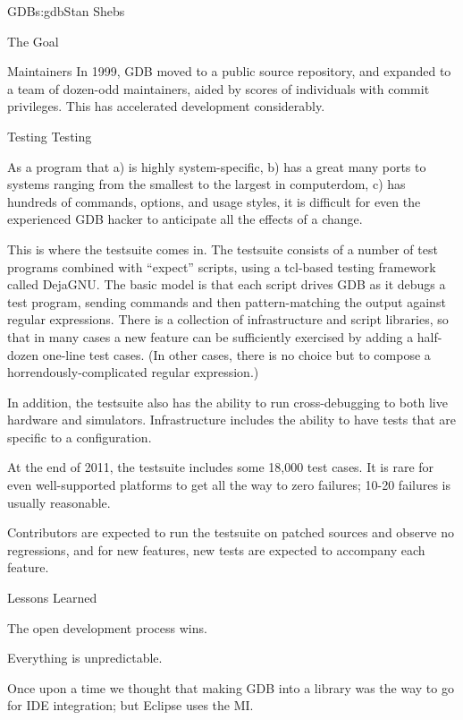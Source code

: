 \begin{aosachapter}{GDB}{s:gdb}{Stan Shebs}
\begin{aosasect1}{The Goal}
\begin{aosasect1}{Maintainers}
In 1999, GDB moved to a public source repository, and expanded to a
team of dozen-odd maintainers, aided by scores of individuals with
commit privileges.  This has accelerated development considerably.

\end{aosasect1}

\begin{aosasect1}{Testing Testing}

As a program that a) is highly system-specific, b) has a great many
ports to systems ranging from the smallest to the largest in
computerdom, c) has hundreds of commands, options, and usage styles,
it is difficult for even the experienced GDB hacker to anticipate all
the effects of a change.

This is where the testsuite comes in.  The testsuite consists of a
number of test programs combined with ``expect'' scripts, using a
tcl-based testing framework called DejaGNU.  The basic model is that
each script drives GDB as it debugs a test program, sending commands and
then pattern-matching the output against regular expressions.  There
is a collection of infrastructure and script libraries, so that in many
cases a new feature can be sufficiently exercised by adding a
half-dozen one-line test cases.  (In other cases, there is no choice
but to compose a horrendously-complicated regular expression.)

In addition, the testsuite also has the ability to run cross-debugging
to both live hardware and simulators.  Infrastructure includes the
ability to have tests that are specific to a configuration.

At the end of 2011, the testsuite includes some 18,000 test cases.  It
is rare for even well-supported platforms to get all the way to zero
failures; 10-20 failures is usually reasonable.

Contributors are expected to run the testsuite on patched sources
and observe no regressions, and for new features, new tests are
expected to accompany each feature.

\end{aosasect1}

\begin{aosasect1}{Lessons Learned}

The open development process wins.

Everything is unpredictable.

Once upon a time we thought that making GDB into a library was the way to go
for IDE integration; but Eclipse uses the MI.


\end{aosasect1}
\end{aosasect1}
\end{aosachapter}
